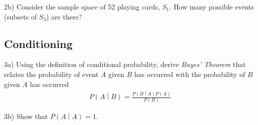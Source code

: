 2b) Consider the sample space of 52 playing cards, \(S_{1}\). 
How many possible events (subsets of \(S_{3}\)) are there?

\subsection{Conditioning}

3a) Using the definition of conditional probability, derive \emph{Bayes' Theorem} 
that relates the probability of event \(A\) given \(B\) 
has occurred with the probability of \(B\) given \(A\) has occurred
\begin{align}
P\left( A \middle| B \right) = \frac{P\left( B \middle| A \right)P(A)}{P(B)}
\end{align}

3b) Show that \(P\left( A \middle| A \right) = 1\).



